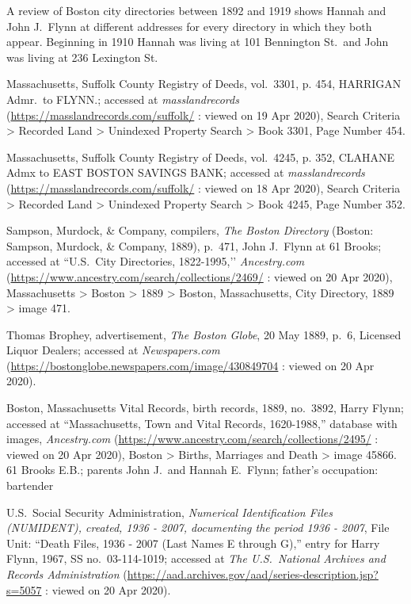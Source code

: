 \begin{thebibliography}{999}
	A review of Boston city directories between 1892 and 1919 shows Hannah and John J.\ Flynn at different addresses for every directory in which they both appear. Beginning in 1910 Hannah was living at 101 Bennington St.\ and John was living at 236 Lexington St.
	
	Massachusetts, Suffolk County Registry of Deeds, vol.\ 3301, p. 454, HARRIGAN Admr.\ to FLYNN.; accessed at \textit{masslandrecords} (\url{https://masslandrecords.com/suffolk/} : viewed on 19 Apr 2020), Search Criteria > Recorded Land > Unindexed Property Search >  Book 3301, Page Number 454.
	
	Massachusetts, Suffolk County Registry of Deeds, vol.\ 4245, p. 352, CLAHANE Admx to EAST BOSTON SAVINGS BANK; accessed at \textit{masslandrecords} (\url{https://masslandrecords.com/suffolk/} : viewed on 18 Apr 2020), Search Criteria > Recorded Land > Unindexed Property Search > Book 4245, Page Number 352.
	
	Sampson, Murdock, \& Company, compilers, \textit{The Boston Directory} (Boston: Sampson, Murdock, \& Company, 1889), p.\ 471, John J.\ Flynn at 61 Brooks; accessed at ``U.S.\ City Directories, 1822-1995,’’ \textit{Ancestry.com} (\url{https://www.ancestry.com/search/collections/2469/} : viewed on 20 Apr 2020), Massachusetts > Boston > 1889 > Boston, Massachusetts, City Directory, 1889 > image 471.
	
	Thomas Brophey, advertisement, \textit{The Boston Globe}, 20 May 1889, p.\ 6, Licensed Liquor Dealers; accessed at \textit{Newspapers.com} (\url{https://bostonglobe.newspapers.com/image/430849704} : viewed on 20 Apr 2020).
	
	Boston, Massachusetts Vital Records, birth records, 1889, no.\ 3892, Harry Flynn; accessed at ``Massachusetts, Town and Vital Records, 1620-1988,'' database with images, \textit{Ancestry.com} (\url{https://www.ancestry.com/search/collections/2495/} : viewed on 20 Apr 2020), Boston > Births, Marriages and Death > image 45866.\\
	61 Brooks E.B.; parents John J.\ and Hannah E.\ Flynn; father's occupation: bartender
	
	U.S.\ Social Security Administration, \textit{Numerical Identification Files (NUMIDENT), created, 1936 - 2007, documenting the period 1936 - 2007}, File Unit: ``Death Files, 1936 - 2007 (Last Names E through G),'' entry for Harry Flynn, 1967,  SS no.\ 03-114-1019; accessed at \textit{The U.S.\ National Archives and Records Administration} (\url{https://aad.archives.gov/aad/series-description.jsp?s=5057} : viewed on 20 Apr 2020).
	

\end{thebibliography}
